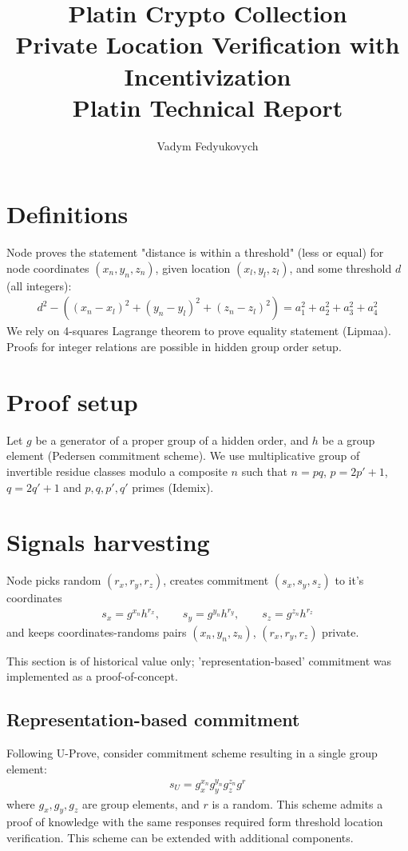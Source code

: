 \documentclass[a4paper,12pt]{article}
\author{
  \small{
  Vadym Fedyukovych
  }
}
\title{Platin Crypto Collection \\
\small{
  Private Location Verification with Incentivization
} \\
\large{
  Platin Technical Report
}
}
\begin{document}
\maketitle
{}

\section{Definitions}
\label{sect-definitions}
Node proves the statement "distance is within a threshold" (less or equal)
for node coordinates $(x_n, y_n, z_n)$,
given location $(x_l, y_l, z_l)$,
and some threshold $d$ (all integers):
\begin{gather}
\label{eq-distn}
  d^2 - ((x_n - x_l)^2 + (y_n - y_l)^2 + (z_n - z_l)^2) = a_1^2 + a_2^2 + a_3^2 + a_4^2
\end{gather}
We rely on 4-squares Lagrange theorem to prove equality statement (Lipmaa).
Proofs for integer relations are possible in hidden group order setup.

\section{Proof setup}

Let $g$ be a generator of a proper group of a hidden order,
and $h$ be a group element (Pedersen commitment scheme).
We use multiplicative group of invertible residue classes modulo a composite $n$ such that
$n=pq$, $p=2p'+1$, $q=2q'+1$ and $p, q, p', q'$ primes (Idemix).

\section{Signals harvesting}
Node picks random $(r_x, r_y, r_z)$, creates commitment $(s_x, s_y, s_z)$ to it's coordinates
\begin{gather}
\label{cmt-pedr}
  s_x = g^{x_n} h^{r_x},   \qquad
  s_y = g^{y_n} h^{r_y},   \qquad
  s_z = g^{z_n} h^{r_z}
\end{gather}
and keeps coordinates-randoms pairs
$(x_n, y_n, z_n)$, $(r_x, r_y, r_z)$
private.

This section is of historical value only;
'representation-based' commitment was implemented as a proof-of-concept.

\subsection{Representation-based commitment}
Following U-Prove, consider commitment scheme resulting in a single group element:
\begin{gather}
\label{cmt-up}
  s_U = g_x^{x_n} g_y^{y_n} g_z^{z_n} g^{r}
\end{gather}
where $g_x, g_y, g_z$ are group elements, and $r$ is a random.
This scheme admits a proof of knowledge with the same responses required form threshold location verification.
This scheme can be extended with additional components. %
\end{document}
